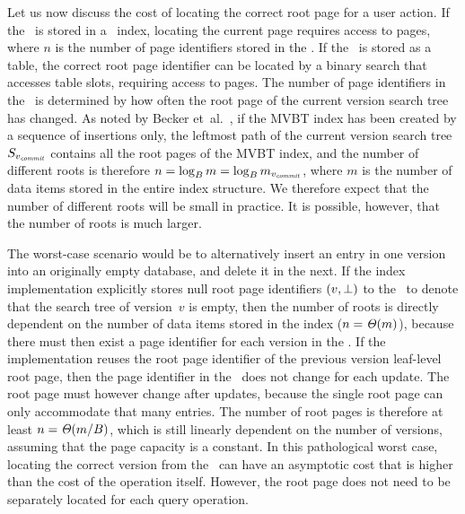 Let us now discuss the cost of locating the correct root page for a user
action.   
If the \rootstar\ is stored in a \Btree\ index, locating the current page
requires access to  pages, where $n$ is the number of
page identifiers stored in the \rootstar.
If the \rootstar\ is stored as a table, the correct root page identifier can
be located by a binary search that accesses  table slots,
requiring access to  pages.
The number of page identifiers in the \rootstar\ is determined by how often
the root page of the current version search tree has changed.
As noted by Becker et~al.~\cite{becker:1996:mvbt}, if the MVBT index has
been created by a sequence of insertions only, the leftmost path of the
current version search tree $S_{\smash{v_{\text{\textit{commit}}}}}$ contains all the root pages of
the MVBT index, and the number of different roots is therefore $n =
\log_{B} m = \log_{B} m_{\smash{v_{\text{\textit{commit}}}}}$, where $m$ is the number
of data items stored in the entire index structure.
We therefore expect that the number of different roots will be small in
practice.
It is possible, however, that the number of roots is much larger.

The worst-case scenario would be to alternatively insert an entry in one
version into an originally empty database, and delete it in the next. 
If the index implementation explicitly stores null root page identifiers $(v,
\bot)$ to the \rootstar\ to denote that the search tree of
version~$v$ is empty, then the number of roots is directly dependent on the
number of data items stored in the index ($n = \mathit{\Theta}(m)$), because there must
then exist a page identifier for each version in the \rootstar. 
If the implementation reuses the root page identifier of the previous version
leaf-level root page, then the page identifier in the \rootstar\ does not
change for each update.  
The root page must however change after \OhT{\capacity} updates, because the
single root page can only accommodate that many entries.
The number of root pages is therefore at least $n = \mathit{\Theta}(m/B)$, which
is still linearly dependent on the number of versions, assuming that the page
capacity is a constant.
In this pathological worst case, locating the correct version
from the \rootstar\ can have an asymptotic cost that is higher than the cost
of the operation itself.
However, the root page does not need to be separately located for each query
operation.

